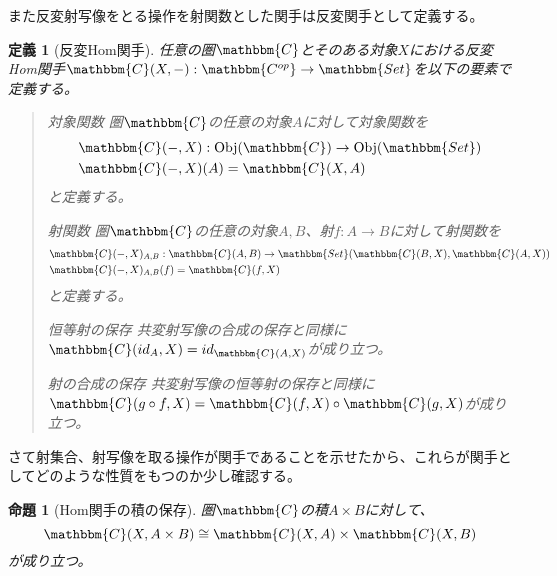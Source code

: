 \documentclass[uplatex,dvipdfmx]{jsarticle}
\newcommand{\cat}[1]{\mathbbm{#1}}
\newcommand{\arrow}{\rightarrow}
\newcommand{\functor}[3]{#1:\cat{#2}\arrow \cat{#3}}
\newcommand{\obj}[1]{\mathrm{Obj}(\cat{#1})}
\newcommand{\mor}[3]{#1:#2\arrow #3}
\newcommand{\arset}[3]{\cat{#1}(#2,#3)}
\newtheorem{prop}[proof]{命題}
\newtheorem{define}[proof]{定義}
\numberwithin{proof}{subsection}
\newenvironment{mydescription}
{\begin{description}
  \setlength{\parskip}{0.5cm}
}
{\end{description}}
\begin{document}
	また反変射写像をとる操作を射関数とした関手は反変関手として定義する。
		\begin{define}[反変Hom関手]
		任意の圏$\cat{C}$とそのある対象$X$における反変Hom関手$\functor{\arset{C}{X}{-}}{C^{op}}{Set}$を以下の要素で定義する。
		\begin{quote}
			\begin{mydescription}
				\item[対象関数] 圏$\cat{C}$の任意の対象$A$に対して対象関数を
				\begin{align*}
					&\mor{\arset{C}{-}{X}}{\obj{C}}{\obj{Set}}\\
					&\arset{C}{-}{X}(A)=\arset{C}{X}{A}
				\end{align*}
				と定義する。
				\item[射関数] 圏$\cat{C}$の任意の対象$A,B$、射$\mor{f}{A}{B}$に対して射関数を
				\begin{align*}
					&\mor{\arset{C}{-}{X}_{A,B}}{\arset{C}{A}{B}}{\arset{Set}{\arset{C}{B}{X}}{\arset{C}{A}{X}}}\\
					&\arset{C}{-}{X}_{A,B}(f)=\arset{C}{f}{X}
				\end{align*}
				と定義する。
				\begin{center}
				\end{center}
				\item[恒等射の保存] 共変射写像の合成の保存と同様に$\arset{C}{id_A}{X}=id_{\arset{C}{A}{X}}$が成り立つ。
				\item[射の合成の保存] 共変射写像の恒等射の保存と同様に$\arset{C}{g\circ f}{X}=\arset{C}{f}{X}\circ\arset{C}{g}{X}$が成り立つ。
			\end{mydescription}
		\end{quote}
	\end{define}
  さて射集合、射写像を取る操作が関手であることを示せたから、これらが関手としてどのような性質をもつのか少し確認する。
	\begin{prop}[Hom関手の積の保存]
		圏$\cat{C}$の積$A\times B$に対して、\[\arset{C}{X}{A\times B}\cong \arset{C}{X}{A}\times \arset{C}{X}{B}\]が成り立つ。
	\end{prop}
\end{document}
